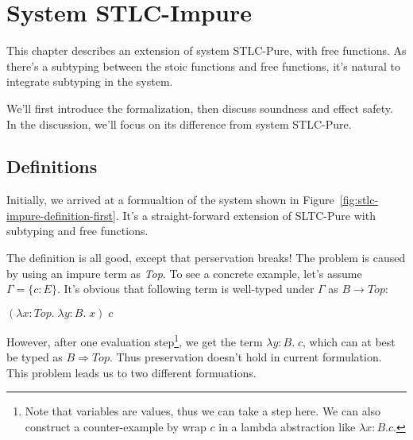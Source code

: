 \section{System STLC-Impure}

This chapter describes an extension of system STLC-Pure, with free
functions. As there's a subtyping between the stoic functions and free
functions, it's natural to integrate subtyping in the system.

We'll first introduce the formalization, then discuss soundness and
effect safety. In the discussion, we'll focus on its difference from
system STLC-Pure.

\subsection{Definitions}

Initially, we arrived at a formualtion of the system shown in
Figure~\ref{fig:stlc-impure-definition-first}. It's a straight-forward
extension of SLTC-Pure with subtyping and free functions.

The definition is all good, except that perservation breaks! The
problem is caused by using an impure term as \emph{Top}. To see a
concrete example, let's assume $\Gamma = \{c:E\}$. It's obvious that
following term is well-typed under $\Gamma$ as $B \to Top$:

\begin{center}
  $(\lambda x:Top. \; \lambda y:B. \; x) \; c$
\end{center}

However, after one evaluation step\footnote{Note that variables are
  values, thus we can take a step here. We can also construct a
  counter-example by wrap $c$ in a lambda abstraction like
  $\lambda x:B. c$.}, we get the term $\lambda y:B. \; c$, which can
at best be typed as $B \Rightarrow Top$. Thus preservation doesn't
hold in current formulation. This problem leads us to two different
formuations.


